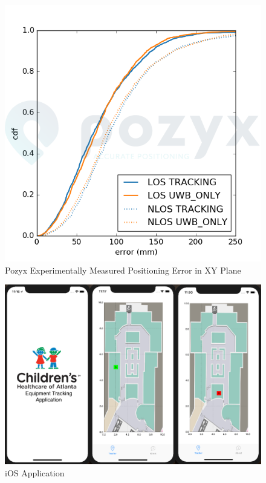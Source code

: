 \documentclass[12pt]{article}
\begin{document}
	\begin{figure}[!htb]
		\centering
		\includegraphics[scale = .4]{PositioningError.png}
		\caption{Pozyx Experimentally Measured Positioning Error in XY Plane}
	\end{figure}

	\begin{figure}[!htb]
		\centering
		\includegraphics[scale = .45]{iOSApp.png}
		\caption{iOS Application}
	\end{figure}
\end{document}
